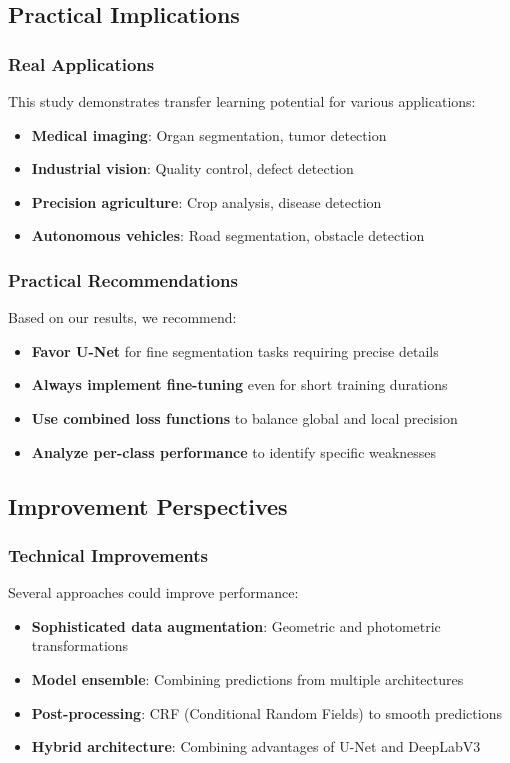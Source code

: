 \documentclass[12pt,a4paper]{article}
\begin{document}
\subsection{Practical Implications}

\subsubsection{Real Applications}

This study demonstrates transfer learning potential for various applications:
\begin{itemize}
    \item \textbf{Medical imaging}: Organ segmentation, tumor detection
    \item \textbf{Industrial vision}: Quality control, defect detection
    \item \textbf{Precision agriculture}: Crop analysis, disease detection
    \item \textbf{Autonomous vehicles}: Road segmentation, obstacle detection
\end{itemize}

\subsubsection{Practical Recommendations}

Based on our results, we recommend:
\begin{itemize}
    \item \textbf{Favor U-Net} for fine segmentation tasks requiring precise details
    \item \textbf{Always implement fine-tuning} even for short training durations
    \item \textbf{Use combined loss functions} to balance global and local precision
    \item \textbf{Analyze per-class performance} to identify specific weaknesses
\end{itemize}

\subsection{Improvement Perspectives}

\subsubsection{Technical Improvements}

Several approaches could improve performance:
\begin{itemize}
    \item \textbf{Sophisticated data augmentation}: Geometric and photometric transformations
    \item \textbf{Model ensemble}: Combining predictions from multiple architectures
    \item \textbf{Post-processing}: CRF (Conditional Random Fields) to smooth predictions
    \item \textbf{Hybrid architecture}: Combining advantages of U-Net and DeepLabV3
\end{itemize}
\end{document}

